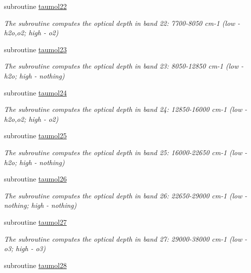\begin{DoxyCompactItemize}
subroutine \hyperlink{zhang__orig_2radsw__main_8f_a3b5392346eee35eb13a2a54175b6338b}{taumol22}
\begin{DoxyCompactList}\small\item\em The subroutine computes the optical depth in band 22\+: 7700-\/8050 cm-\/1 (low -\/ h2o,o2; high -\/ o2) \end{DoxyCompactList}\item 
subroutine \hyperlink{zhang__orig_2radsw__main_8f_adf5d73763c80ec079b72dda7d74cba94}{taumol23}
\begin{DoxyCompactList}\small\item\em The subroutine computes the optical depth in band 23\+: 8050-\/12850 cm-\/1 (low -\/ h2o; high -\/ nothing) \end{DoxyCompactList}\item 
subroutine \hyperlink{zhang__orig_2radsw__main_8f_ae0abf1a08aa5d6ca14bfea83d0603716}{taumol24}
\begin{DoxyCompactList}\small\item\em The subroutine computes the optical depth in band 24\+: 12850-\/16000 cm-\/1 (low -\/ h2o,o2; high -\/ o2) \end{DoxyCompactList}\item 
subroutine \hyperlink{zhang__orig_2radsw__main_8f_a21b72d6de9247eccb20de836ea76cf7a}{taumol25}
\begin{DoxyCompactList}\small\item\em The subroutine computes the optical depth in band 25\+: 16000-\/22650 cm-\/1 (low -\/ h2o; high -\/ nothing) \end{DoxyCompactList}\item 
subroutine \hyperlink{zhang__orig_2radsw__main_8f_a20261640145a5d10e091ef3c67763175}{taumol26}
\begin{DoxyCompactList}\small\item\em The subroutine computes the optical depth in band 26\+: 22650-\/29000 cm-\/1 (low -\/ nothing; high -\/ nothing) \end{DoxyCompactList}\item 
subroutine \hyperlink{zhang__orig_2radsw__main_8f_a7d2cea6cc0cfde853d25a14ba0efcca2}{taumol27}
\begin{DoxyCompactList}\small\item\em The subroutine computes the optical depth in band 27\+: 29000-\/38000 cm-\/1 (low -\/ o3; high -\/ o3) \end{DoxyCompactList}\item 
subroutine \hyperlink{zhang__orig_2radsw__main_8f_a2113c76707f43cf91fe5926ab69d1b8b}{taumol28}

\end{DoxyCompactItemize}
